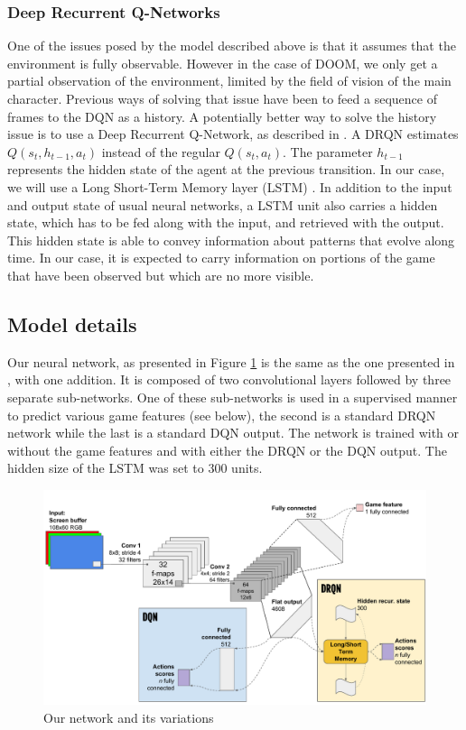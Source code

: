 \documentclass[letterpaper]{article}
\begin{document}
\subsubsection{Deep Recurrent Q-Networks}
One of the issues posed by the model described above is that it assumes that the
environment is fully observable. However in the case of DOOM, we only get a
partial
observation of the environment, limited by the field of vision of the main
character. Previous ways of solving that issue have been to feed a sequence of
frames to the DQN as a history.
A potentially better way to solve the history issue is to use a Deep Recurrent
Q-Network, as described in \citep{Hausknecht2015}. A DRQN
estimates $Q(s_t,h_{t-1},a_t)$ instead of the regular $Q(s_t,a_t)$. The
parameter $h_{t-1}$ represents the hidden state of the agent at the previous
transition. In our case, we will use a Long Short-Term Memory layer (LSTM)
\citep{Hochreiter1997}. In addition to the input and output state of usual neural
networks, a LSTM unit also carries a hidden state, which has to be fed along
with the input, and retrieved with the output. This hidden state is able to
convey information about patterns that evolve along time. In our case, it is
expected to carry information on portions of the game that have been observed
but which are no more visible.

\subsection{Model details}
Our neural network, as presented in Figure \ref{fig:drqn-schema} is the same as
the one presented in \citep{Lample2016}, with one addition.
It is composed of two convolutional layers followed by three separate
sub-networks. One of these sub-networks is used in a supervised manner to
predict various game features (see below), the second is a standard
DRQN network while the last is a standard DQN output. The network is trained
with or without the game features and with either the DRQN or the DQN output.
The hidden size of the LSTM was set to 300 units.

\begin{figure}[h]
  \centering
  \includegraphics[width=.9\textwidth]{DRQNSchema.pdf}
  \caption{\label{fig:drqn-schema} Our network and its variations}
\end{figure}
\end{document}

